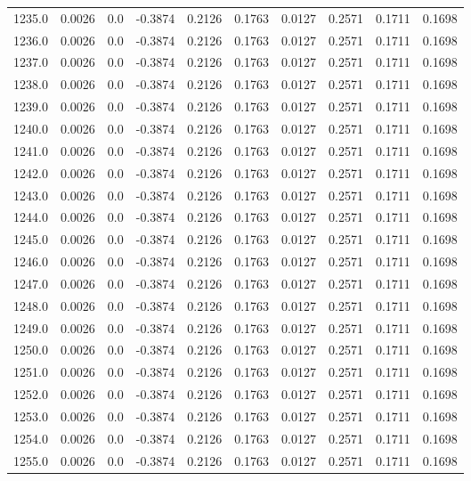 \begin{longtable}{lrrrrrrrrr}
1235.0 & 0.0026 & 0.0 & -0.3874 & 0.2126 & 0.1763 & 0.0127 & 0.2571 & 0.1711 & 0.1698 \\
1236.0 & 0.0026 & 0.0 & -0.3874 & 0.2126 & 0.1763 & 0.0127 & 0.2571 & 0.1711 & 0.1698 \\
1237.0 & 0.0026 & 0.0 & -0.3874 & 0.2126 & 0.1763 & 0.0127 & 0.2571 & 0.1711 & 0.1698 \\
1238.0 & 0.0026 & 0.0 & -0.3874 & 0.2126 & 0.1763 & 0.0127 & 0.2571 & 0.1711 & 0.1698 \\
1239.0 & 0.0026 & 0.0 & -0.3874 & 0.2126 & 0.1763 & 0.0127 & 0.2571 & 0.1711 & 0.1698 \\
1240.0 & 0.0026 & 0.0 & -0.3874 & 0.2126 & 0.1763 & 0.0127 & 0.2571 & 0.1711 & 0.1698 \\
1241.0 & 0.0026 & 0.0 & -0.3874 & 0.2126 & 0.1763 & 0.0127 & 0.2571 & 0.1711 & 0.1698 \\
1242.0 & 0.0026 & 0.0 & -0.3874 & 0.2126 & 0.1763 & 0.0127 & 0.2571 & 0.1711 & 0.1698 \\
1243.0 & 0.0026 & 0.0 & -0.3874 & 0.2126 & 0.1763 & 0.0127 & 0.2571 & 0.1711 & 0.1698 \\
1244.0 & 0.0026 & 0.0 & -0.3874 & 0.2126 & 0.1763 & 0.0127 & 0.2571 & 0.1711 & 0.1698 \\
1245.0 & 0.0026 & 0.0 & -0.3874 & 0.2126 & 0.1763 & 0.0127 & 0.2571 & 0.1711 & 0.1698 \\
1246.0 & 0.0026 & 0.0 & -0.3874 & 0.2126 & 0.1763 & 0.0127 & 0.2571 & 0.1711 & 0.1698 \\
1247.0 & 0.0026 & 0.0 & -0.3874 & 0.2126 & 0.1763 & 0.0127 & 0.2571 & 0.1711 & 0.1698 \\
1248.0 & 0.0026 & 0.0 & -0.3874 & 0.2126 & 0.1763 & 0.0127 & 0.2571 & 0.1711 & 0.1698 \\
1249.0 & 0.0026 & 0.0 & -0.3874 & 0.2126 & 0.1763 & 0.0127 & 0.2571 & 0.1711 & 0.1698 \\
1250.0 & 0.0026 & 0.0 & -0.3874 & 0.2126 & 0.1763 & 0.0127 & 0.2571 & 0.1711 & 0.1698 \\
1251.0 & 0.0026 & 0.0 & -0.3874 & 0.2126 & 0.1763 & 0.0127 & 0.2571 & 0.1711 & 0.1698 \\
1252.0 & 0.0026 & 0.0 & -0.3874 & 0.2126 & 0.1763 & 0.0127 & 0.2571 & 0.1711 & 0.1698 \\
1253.0 & 0.0026 & 0.0 & -0.3874 & 0.2126 & 0.1763 & 0.0127 & 0.2571 & 0.1711 & 0.1698 \\
1254.0 & 0.0026 & 0.0 & -0.3874 & 0.2126 & 0.1763 & 0.0127 & 0.2571 & 0.1711 & 0.1698 \\
1255.0 & 0.0026 & 0.0 & -0.3874 & 0.2126 & 0.1763 & 0.0127 & 0.2571 & 0.1711 & 0.1698 \\

\end{longtable}
